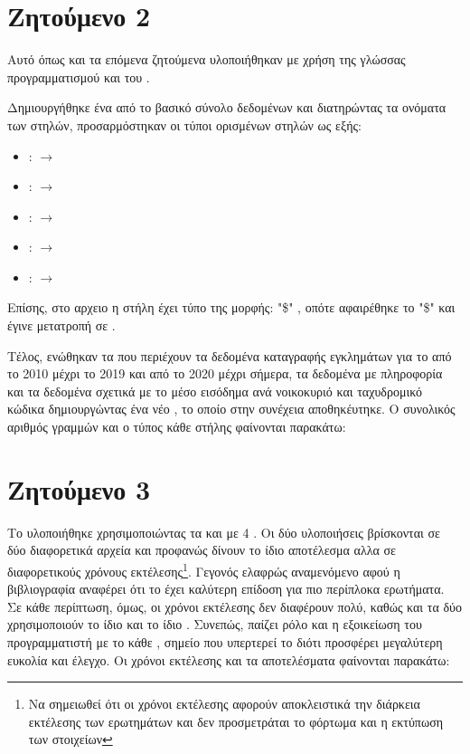 \documentclass[11pt]{article}
\makeatletter
\newcommand{\readfirstline}[1]{%
  \openin\file@read=#1\relax
  \read\file@read to\@tempa
  \closein\file@read
  \@tempa
}
\makeatother
\begin{document}
\section*{Ζητούμενο 2}
Αυτό όπως και τα επόμενα ζητούμενα υλοποιήθηκαν με χρήση της γλώσσας προγραμματισμού  και του .
\par Δημιουργήθηκε ένα  από το βασικό σύνολο δεδομένων και διατηρώντας τα ονόματα των στηλών, προσαρμόστηκαν οι τύποι ορισμένων στηλών ως εξής:
\begin{itemize}
  \item {} :  $\rightarrow$ 
  \item {} :  $\rightarrow$ 
  \item {} :  $\rightarrow$ 
  \item {} :  $\rightarrow$ 
  \item {} :  $\rightarrow$ 
\end{itemize}
\par Επίσης, στο αρχειο  η στήλη   έχει τύπο  της μορφής: "\$" , οπότε αφαιρέθηκε το "\$" και έγινε μετατροπή σε .
\par Τέλος, ενώθηκαν τα  που περιέχουν τα δεδομένα καταγραφής εγκλημάτων για το  από το 2010 μέχρι το 2019 και από το 2020 μέχρι σήμερα, τα δεδομένα με  πληροφορία και τα δεδομένα σχετικά με το μέσο εισόδημα ανά νοικοκυριό και ταχυδρομικό κώδικα δημιουργώντας ένα νέο , το οποίο στην συνέχεια αποθηκέυτηκε.
\newpage Ο συνολικός αριθμός γραμμών και ο τύπος κάθε στήλης φαίνονται παρακάτω:
\texten{}
\newpage
\section*{Ζητούμενο 3}
Το  υλοποιήθηκε χρησιμοποιώντας τα  και  με 4 . Οι δύο υλοποιήσεις βρίσκονται σε δύο διαφορετικά αρχεία και προφανώς δίνουν το ίδιο αποτέλεσμα αλλα σε διαφορετικούς χρόνους εκτέλεσης\footnote[1]{Να σημειωθεί ότι οι χρόνοι εκτέλεσης αφορούν αποκλειστικά την διάρκεια εκτέλεσης των ερωτημάτων και δεν προσμετράται το φόρτωμα και η εκτύπωση των στοιχείων}. Γεγονός ελαφρώς αναμενόμενο αφού η βιβλιογραφία αναφέρει ότι το  έχει καλύτερη επίδοση για πιο περίπλοκα ερωτήματα. Σε κάθε περίπτωση, όμως, οι χρόνοι εκτέλεσης δεν διαφέρουν πολύ, καθώς και τα δύο  χρησιμοποιούν το ίδιο  και το ίδιο . Συνεπώς, παίζει ρόλο και η εξοικείωση του προγραμματιστή με το κάθε , σημείο που υπερτερεί το  διότι προσφέρει μεγαλύτερη ευκολία και έλεγχο. 
Οι χρόνοι εκτέλεσης και τα αποτελέσματα φαίνονται παρακάτω: \break
\texten{\texttt{\readfirstline{outputs/Query1DF.txt}}}
\texten{}
\end{document}
